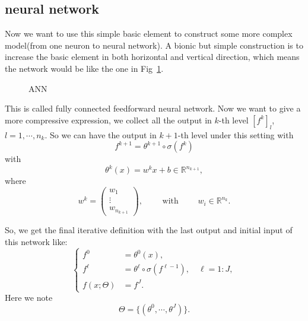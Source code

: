 \subsection{neural network}
Now we want to use this simple basic element to construct some more complex model(from one neuron to neural network). A bionic but simple construction is to increase the basic element in both horizontal and vertical direction, which means the network would be like the one in Fig~\ref{fig:ANN}.
\begin{figure}[!ht]
	\caption{ANN}
	\label{fig:ANN}
\end{figure}

This is called fully connected feedforward neural network. Now we want to give a more compressive expression, we collect all the output in $k$-th level $[f^{k}]_l$, $l = 1,\cdots, n_k$.
So we can have the output in $k+1$-th level under this setting with
\begin{equation}
{f}^{k+1} = \theta^{k+1}\circ \sigma (f^{k})
\end{equation}
with
\begin{equation}
\theta^k(x) = w^kx+b \in\mathbb{R}^{n_{k+1}},
\end{equation} 
where 
\begin{equation}
w^k= 
\begin{pmatrix}
w_1 \\
\vdots \\
w_{n_{k+1}}
\end{pmatrix},\qquad \mbox{ with }\qquad w_i \in \mathbb{R}^{n_k}.
\end{equation} 

So, we get the final iterative definition with the last output and initial input of this network like:
\begin{equation}
\begin{cases}
f^{0} &= \theta^0(x), \\
f^{\ell} &= \theta^{\ell}\circ \sigma(f^{\ell-1}), \quad \ell = 1:J, \\
f(x;\Theta) &= f^J.
\end{cases}
\end{equation}
Here we note 
\begin{equation}
\Theta = \{ (\theta^0, \cdots, \theta^J) \}.
\end{equation}


